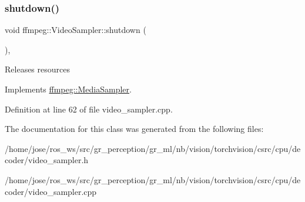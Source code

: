 \mbox{\label{classffmpeg_1_1VideoSampler_adebf591691d44b6f37bdcc74e3719554}} 
\subsubsection{\texorpdfstring{shutdown()}{shutdown()}}
{\footnotesize\ttfamily void ffmpeg\+::\+Video\+Sampler\+::shutdown (\begin{DoxyParamCaption}{ }\end{DoxyParamCaption})\hspace{0.3cm}{\ttfamily [override]}, {\ttfamily [virtual]}}

Releases resources 

Implements \hyperlink{classffmpeg_1_1MediaSampler_ac8f2fee9cdf896871776a8202d70edd7}{ffmpeg\+::\+Media\+Sampler}.



Definition at line 62 of file video\+\_\+sampler.\+cpp.



The documentation for this class was generated from the following files\+:\begin{DoxyCompactItemize}
\item 
/home/jose/ros\+\_\+ws/src/gr\+\_\+perception/gr\+\_\+ml/nb/vision/torchvision/csrc/cpu/decoder/video\+\_\+sampler.\+h\item 
/home/jose/ros\+\_\+ws/src/gr\+\_\+perception/gr\+\_\+ml/nb/vision/torchvision/csrc/cpu/decoder/video\+\_\+sampler.\+cpp\end{DoxyCompactItemize}
